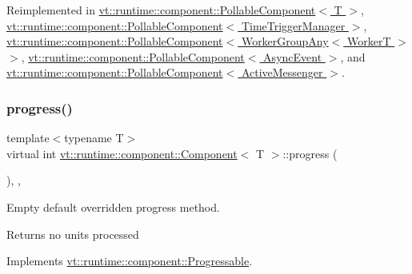 Reimplemented in \hyperlink{structvt_1_1runtime_1_1component_1_1_pollable_component_a8ad6cfbc184ed9862cae5304605fe025}{vt\+::runtime\+::component\+::\+Pollable\+Component$<$ T $>$}, \hyperlink{structvt_1_1runtime_1_1component_1_1_pollable_component_a8ad6cfbc184ed9862cae5304605fe025}{vt\+::runtime\+::component\+::\+Pollable\+Component$<$ Time\+Trigger\+Manager $>$}, \hyperlink{structvt_1_1runtime_1_1component_1_1_pollable_component_a8ad6cfbc184ed9862cae5304605fe025}{vt\+::runtime\+::component\+::\+Pollable\+Component$<$ Worker\+Group\+Any$<$ Worker\+T $>$ $>$}, \hyperlink{structvt_1_1runtime_1_1component_1_1_pollable_component_a8ad6cfbc184ed9862cae5304605fe025}{vt\+::runtime\+::component\+::\+Pollable\+Component$<$ Async\+Event $>$}, and \hyperlink{structvt_1_1runtime_1_1component_1_1_pollable_component_a8ad6cfbc184ed9862cae5304605fe025}{vt\+::runtime\+::component\+::\+Pollable\+Component$<$ Active\+Messenger $>$}.

\mbox{\label{structvt_1_1runtime_1_1component_1_1_component_a1dab11d9eb5bed8dfd5a3bb8fdf67f5a}} 
\subsubsection{\texorpdfstring{progress()}{progress()}}
{\footnotesize\ttfamily template$<$typename T$>$ \\
virtual int \hyperlink{structvt_1_1runtime_1_1component_1_1_component}{vt\+::runtime\+::component\+::\+Component}$<$ T $>$\+::progress (\begin{DoxyParamCaption}{ }\end{DoxyParamCaption})\hspace{0.3cm}{\ttfamily [inline]}, {\ttfamily [override]}, {\ttfamily [virtual]}}



Empty default overridden progress method. 

\begin{DoxyReturn}{Returns}
no units processed 
\end{DoxyReturn}


Implements \hyperlink{structvt_1_1runtime_1_1component_1_1_progressable_a37e883d4822db4f1effa9587b9f1160d}{vt\+::runtime\+::component\+::\+Progressable}.



